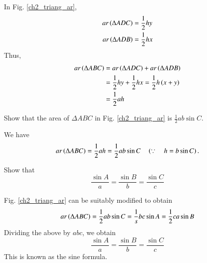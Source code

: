 \proof In Fig. \ref{ch2_triang_ar},
\begin{align}
ar\left(\Delta ADC\right) &= \frac{1}{2}hy \\
ar\left(\Delta ADB\right) &= \frac{1}{2}hx 
\end{align}
Thus,
\begin{align}
ar\left(\Delta ABC\right) &= ar\left(\Delta ADC\right) + ar\left(\Delta ADB\right) \\
&= \frac{1}{2}hy + \frac{1}{2}hx = \frac{1}{2}h\left(x+y\right) \\
&= \frac{1}{2}ah
\end{align}
\begin{problem}
	Show that the area of $\Delta ABC$ in Fig. 	\ref{ch2_triang_ar}	is $\frac{1}{2}ab \sin C$.
\end{problem}
\proof We have
%
\begin{equation}
ar\left(\Delta ABC\right) = \frac{1}{2}ah = \frac{1}{2}ab\sin C \quad \left(\because \quad h = b \sin C\right).
\end{equation}
%
\begin{problem}
	Show that 
	\begin{equation}
	\frac{\sin A}{a} = \frac{\sin B}{b} = \frac{\sin C}{c}
	\end{equation}
\end{problem}
\proof Fig. \ref{ch2_triang_ar} can be suitably modified to obtain 
\begin{equation}
ar\left(\Delta ABC\right) = \frac{1}{2}ab\sin C = \frac{1}{s}bc\sin A = \frac{1}{2}ca\sin B
\end{equation}
Dividing the above by $abc$, we obtain
	\begin{equation}
	\frac{\sin A}{a} = \frac{\sin B}{b} = \frac{\sin C}{c}
	\end{equation}
This is known as the sine formula.	
%
